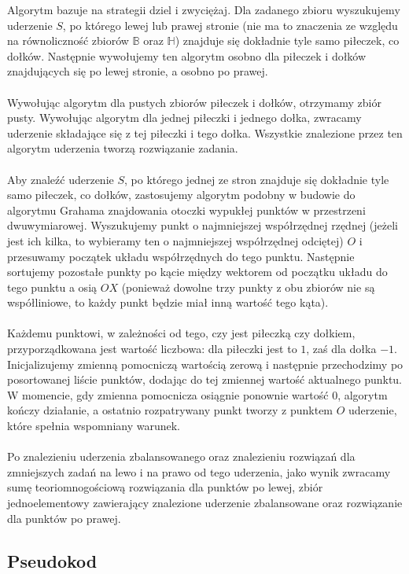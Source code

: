 \documentclass[10pt,a4paper]{article}
\begin{document}
	Algorytm bazuje na strategii dziel i zwyciężaj. Dla zadanego zbioru wyszukujemy uderzenie $S$, po którego lewej lub prawej stronie (nie ma to znaczenia ze względu na równoliczność zbiorów $\mathbb{B}$ oraz $\mathbb{H}$) znajduje się dokładnie tyle samo piłeczek, co dołków. Następnie wywołujemy ten algorytm osobno dla piłeczek i dołków znajdujących się po lewej stronie, a osobno po prawej. \\~\\
	Wywołując algorytm dla pustych zbiorów piłeczek i dołków, otrzymamy zbiór pusty. Wywołując algorytm dla jednej piłeczki i jednego dołka, zwracamy uderzenie składające się z tej piłeczki i tego dołka. Wszystkie znalezione przez ten algorytm uderzenia tworzą rozwiązanie zadania. \\~\\
	Aby znaleźć uderzenie $S$, po którego jednej ze stron znajduje się dokładnie tyle samo piłeczek, co dołków, zastosujemy algorytm podobny w budowie do algorytmu Grahama znajdowania otoczki wypukłej punktów w przestrzeni dwuwymiarowej. Wyszukujemy punkt o najmniejszej współrzędnej rzędnej (jeżeli jest ich kilka, to wybieramy ten o najmniejszej współrzędnej odciętej) $O$ i przesuwamy początek układu współrzędnych do tego punktu. Następnie sortujemy pozostałe punkty po kącie między wektorem od początku układu do tego punktu a osią $OX$ (ponieważ dowolne trzy punkty z obu zbiorów nie są współliniowe, to każdy punkt będzie miał inną wartość tego kąta). \\~\\
	Każdemu punktowi, w zależności od tego, czy jest piłeczką czy dołkiem, przyporządkowana jest wartość liczbowa: dla piłeczki jest to $1$, zaś dla dołka $-1$. Inicjalizujemy zmienną pomocniczą wartością zerową i następnie przechodzimy po posortowanej liście punktów, dodając do tej zmiennej wartość aktualnego punktu. W momencie, gdy zmienna pomocnicza osiągnie ponownie wartość $0$, algorytm kończy działanie, a ostatnio rozpatrywany punkt tworzy z punktem $O$ uderzenie, które spełnia wspomniany warunek.\\~\\
	Po znalezieniu uderzenia zbalansowanego oraz znalezieniu rozwiązań dla zmniejszych zadań na lewo i na prawo od tego uderzenia, jako wynik zwracamy sumę teoriomnogościową rozwiązania dla punktów po lewej, zbiór jednoelementowy zawierający znalezione uderzenie zbalansowane oraz rozwiązanie dla punktów po prawej.
	
	\subsection{Pseudokod}
\end{document}
